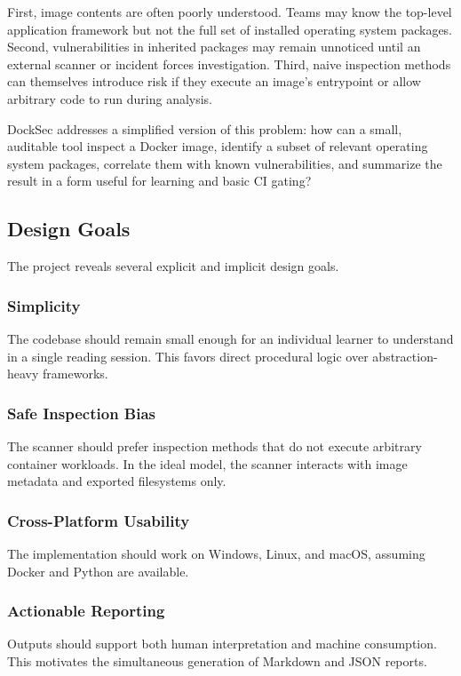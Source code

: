 \documentclass[12pt,draftclsnofoot,onecolumn]{IEEEtran}
\begin{document}
First, image contents are often poorly understood. Teams may know the top-level application framework but not the full set of installed operating system packages. Second, vulnerabilities in inherited packages may remain unnoticed until an external scanner or incident forces investigation. Third, naive inspection methods can themselves introduce risk if they execute an image's entrypoint or allow arbitrary code to run during analysis.

DockSec addresses a simplified version of this problem: how can a small, auditable tool inspect a Docker image, identify a subset of relevant operating system packages, correlate them with known vulnerabilities, and summarize the result in a form useful for learning and basic CI gating?

\subsection{Design Goals}
The project reveals several explicit and implicit design goals.

\subsubsection{Simplicity}
The codebase should remain small enough for an individual learner to understand in a single reading session. This favors direct procedural logic over abstraction-heavy frameworks.

\subsubsection{Safe Inspection Bias}
The scanner should prefer inspection methods that do not execute arbitrary container workloads. In the ideal model, the scanner interacts with image metadata and exported filesystems only.

\subsubsection{Cross-Platform Usability}
The implementation should work on Windows, Linux, and macOS, assuming Docker and Python are available.

\subsubsection{Actionable Reporting}
Outputs should support both human interpretation and machine consumption. This motivates the simultaneous generation of Markdown and JSON reports.
\end{document}
